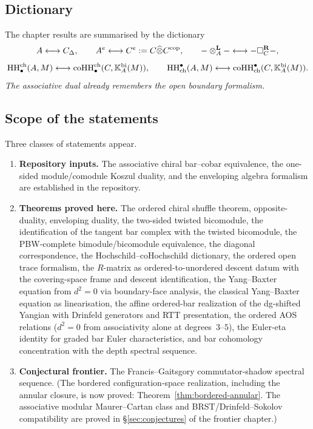 \subsection*{Dictionary}
The chapter results are summarised by the dictionary
\[
A \longleftrightarrow C_\Delta,\qquad
A^e \longleftrightarrow C^e:=C\widehat\otimes C^{\mathrm{cop}},\qquad
-\otimes_A^{\mathbf L}- \longleftrightarrow -\square_C^{\mathbf R}-,
\]
\[
\operatorname{HH}^{\mathrm{ch}}_\bullet(A,M)
\longleftrightarrow
\operatorname{coHH}^{\mathrm{ch}}_\bullet(C,\mathbb{K}_A^{\mathrm{bi}}(M)),
\qquad
\operatorname{HH}_{\mathrm{ch}}^\bullet(A,M)
\longleftrightarrow
\operatorname{coHH}_{\mathrm{ch}}^\bullet(C,\mathbb{K}_A^{\mathrm{bi}}(M)).
\]
\emph{The associative dual already remembers the open boundary formalism.}

\subsection*{Scope of the statements}
Three classes of statements appear.

\begin{enumerate}[label=(\roman*)]
\item \textbf{Repository inputs.}
The associative chiral bar--cobar equivalence, the one-sided
module/comodule Koszul duality, and the enveloping algebra formalism
are established in the repository.

\item \textbf{Theorems proved here.}
The ordered chiral shuffle theorem, opposite-duality, enveloping duality, the two-sided twisted
bicomodule, the identification of the tangent bar complex with the twisted bicomodule, the PBW-complete
bimodule/bicomodule equivalence, the diagonal correspondence, the Hochschild--coHochschild
dictionary, the ordered open trace formalism, the $R$-matrix as
ordered-to-unordered descent datum with the covering-space frame and descent identification,
the Yang--Baxter equation from $d^2=0$ via boundary-face analysis, the classical
Yang--Baxter equation as linearisation, the affine ordered-bar
realization of the dg-shifted Yangian with Drinfeld generators and
RTT presentation, the ordered AOS relations ($d^2=0$ from
associativity alone at degrees~$3$--$5$), the Euler-eta identity for
graded bar Euler characteristics, and bar cohomology concentration with
the depth spectral sequence.

\item \textbf{Conjectural frontier.}
The Francis--Gaitsgory commutator-shadow spectral
sequence. (The bordered configuration-space realization, including the annular closure,
is now proved: Theorem~\ref{thm:bordered-annular}. The associative modular Maurer--Cartan
class and BRST/Drinfeld--Sokolov compatibility are proved in
\S\ref*{sec:conjectures} of the frontier chapter.)
\end{enumerate}

